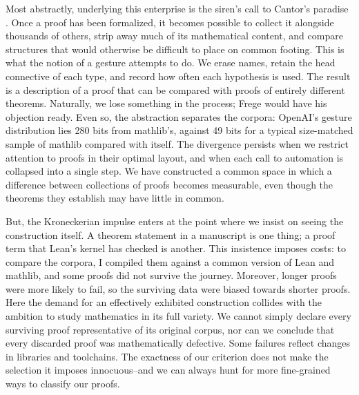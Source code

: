 \documentclass{article}
\begin{document}
Most abstractly, underlying this enterprise is the siren's call to Cantor's paradise \textit{\parencite{hilbert1926}}. Once a proof has been formalized, 
it becomes possible to collect it alongside thousands of others, strip away much of its mathematical content, and compare 
structures that would otherwise be difficult to place on common footing. This is what the notion of a gesture attempts 
to do. We erase names, retain the head connective of each type, and record how often each hypothesis is used. The result 
is a description of a proof that can be compared with proofs of entirely different theorems. Naturally, we lose something 
in the process; Frege would have his objection ready. Even so, the abstraction separates the corpora: OpenAI's gesture distribution lies 
280 bits from mathlib's, against 49 bits for a typical size-matched sample of mathlib compared with itself. The 
divergence persists when we restrict attention to proofs in their optimal layout, and when each call to automation is
collapsed into a single step. We have constructed a common space in 
which a difference between collections of proofs becomes measurable, even though the theorems they establish may have 
little in common.

But, the Kroneckerian impulse enters at the point where we insist on seeing the construction itself. A theorem 
statement in a manuscript is one thing; a proof term that Lean's kernel has checked is another. This insistence 
imposes costs: to compare the corpora, I compiled them against a common version of Lean and mathlib, and some proofs 
did not survive the journey. Moreover, longer proofs were more likely to fail, so the surviving data were 
biased towards shorter proofs. Here the demand for an effectively exhibited construction collides with the ambition to 
study mathematics in its full variety. We cannot simply declare every surviving proof representative of its original 
corpus, nor can we conclude that every discarded proof was mathematically defective. Some failures reflect changes in 
libraries and toolchains. The exactness of our criterion does not make the selection it imposes innocuous--and we can always 
hunt for more fine-grained ways to classify our proofs.
\end{document}
